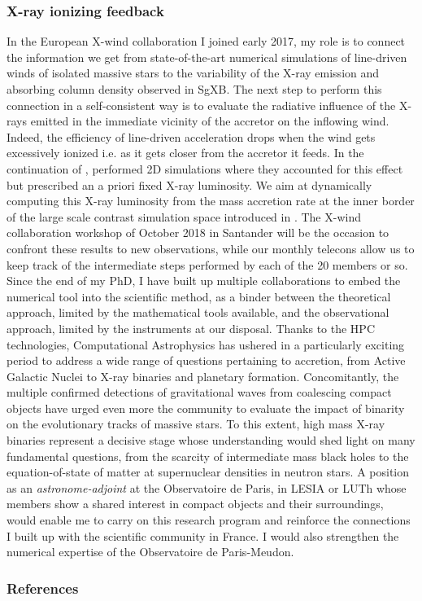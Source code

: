 \documentclass[a4paper,12pt,onecolumn]{article}
\makeatletter
\newcommand{\sgx}{SgXB\xspace}
\newcommand*{\ie}{i.e.\@\xspace}
\makeatother
\begin{document}
\subsubsection*{X-ray ionizing feedback}

In the European X-wind collaboration I joined early 2017, my role is to connect the information we get from state-of-the-art numerical simulations of line-driven winds of isolated massive stars to the variability of the X-ray emission and absorbing column density observed in \sgx. The next step to perform this connection in a self-consistent way is to evaluate the radiative influence of the X-rays emitted in the immediate vicinity of the accretor on the inflowing wind. Indeed, the efficiency of line-driven acceleration drops when the wind gets excessively ionized \ie as it gets closer from the accretor it feeds. In the continuation of \cite{Blondin1990}, \cite{Manousakis2015c} performed 2D simulations where they accounted for this effect but prescribed an a priori fixed X-ray luminosity. We aim at dynamically computing this X-ray luminosity from the mass accretion rate at the inner border of the large scale contrast simulation space introduced in \cite{ElMellah}. The X-wind collaboration workshop of October 2018 in Santander will be the occasion to confront these results to new observations, while our monthly telecons allow us to keep track of the intermediate steps performed by each of the 20 members or so.\\

Since the end of my PhD, I have built up multiple collaborations to embed the numerical tool into the scientific method, as a binder between the theoretical approach, limited by the mathematical tools available, and the observational approach, limited by the instruments at our disposal. Thanks to the HPC technologies, Computational Astrophysics has ushered in a particularly exciting period to address a wide range of questions pertaining to accretion, from Active Galactic Nuclei to X-ray binaries and planetary formation. Concomitantly, the multiple confirmed detections of gravitational waves from coalescing compact objects have urged even more the community to evaluate the impact of binarity on the evolutionary tracks of massive stars. To this extent, high mass X-ray binaries represent a decisive stage whose understanding would shed light on many fundamental questions, from the scarcity of intermediate mass black holes to the equation-of-state of matter at supernuclear densities in neutron stars. A position as an \textit{astronome-adjoint} at the Observatoire de Paris, in LESIA or LUTh whose members show a shared interest in compact objects and their surroundings, would enable me to carry on this research program and reinforce the connections I built up with the scientific community in France. I would also strengthen the numerical expertise of the Observatoire de Paris-Meudon.\\



\vspace*{-0.5cm}
\subsubsection*{References}
{\def\section*#1{}
\setlength{\bibsep}{5pt}
\footnotesize


}
\end{document}
